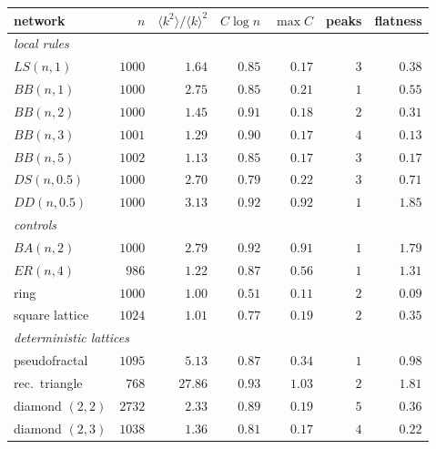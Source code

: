 \begin{center}
\footnotesize\setlength{\tabcolsep}{4pt}
\begin{tabular}{lrrrrrr}
\hline
network & $n$ & $\langle k^2\rangle/\langle k\rangle^2$ & $C\log n$ & $\max C$ & peaks & flatness\\
\hline
\multicolumn{7}{l}{\emph{local rules}}\\
\quad $LS(n,1)$ & $1000$ & $1.64$ & $0.85$ & $0.17$ & $3$ & $0.38$\\
\quad $BB(n,1)$ & $1000$ & $2.75$ & $0.85$ & $0.21$ & $1$ & $0.55$\\
\quad $BB(n,2)$ & $1000$ & $1.45$ & $0.91$ & $0.18$ & $2$ & $0.31$\\
\quad $BB(n,3)$ & $1001$ & $1.29$ & $0.90$ & $0.17$ & $4$ & $0.13$\\
\quad $BB(n,5)$ & $1002$ & $1.13$ & $0.85$ & $0.17$ & $3$ & $0.17$\\
\quad $DS(n,0.5)$ & $1000$ & $2.70$ & $0.79$ & $0.22$ & $3$ & $0.71$\\
\quad $DD(n,0.5)$ & $1000$ & $3.13$ & $0.92$ & $0.92$ & $1$ & $1.85$\\
\multicolumn{7}{l}{\emph{controls}}\\
\quad $BA(n,2)$ & $1000$ & $2.79$ & $0.92$ & $0.91$ & $1$ & $1.79$\\
\quad $ER(n,4)$ & $986$ & $1.22$ & $0.87$ & $0.56$ & $1$ & $1.31$\\
\quad ring & $1000$ & $1.00$ & $0.51$ & $0.11$ & $2$ & $0.09$\\
\quad square lattice & $1024$ & $1.01$ & $0.77$ & $0.19$ & $2$ & $0.35$\\
\multicolumn{7}{l}{\emph{deterministic lattices}}\\
\quad pseudofractal & $1095$ & $5.13$ & $0.87$ & $0.34$ & $1$ & $0.98$\\
\quad rec.\ triangle & $768$ & $27.86$ & $0.93$ & $1.03$ & $2$ & $1.81$\\
\quad diamond $(2,2)$ & $2732$ & $2.33$ & $0.89$ & $0.19$ & $5$ & $0.36$\\
\quad diamond $(2,3)$ & $1038$ & $1.36$ & $0.81$ & $0.17$ & $4$ & $0.22$\\
\hline
\end{tabular}
\end{center}
